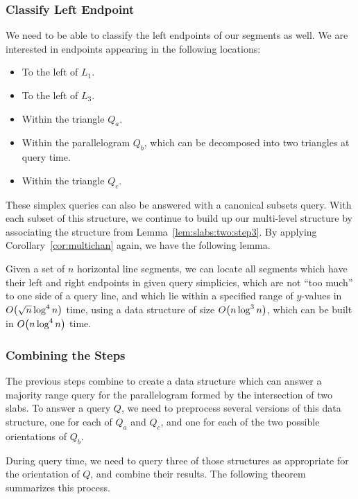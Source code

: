 \subsubsection{Classify Left Endpoint}

We need to be able to classify the left endpoints of our segments as well. We are interested in endpoints appearing in the following locations:

\begin{itemize}
 \item To the left of $L_1$.
 \item To the left of $L_3$.
 \item Within the triangle $Q_a$.
 \item Within the parallelogram $Q_b$, which can be decomposed into two triangles at query time.
 \item Within the triangle $Q_c$.
\end{itemize}

These simplex queries can also be answered with a canonical subsets query. 
With each subset of this structure, we continue to build up our multi-level structure by associating the structure from Lemma~\ref{lem:slabs:two:step3}. 
By applying Corollary~\ref{cor:multichan} again, we have the following lemma.

\begin{lemma}
\label{lem:slabs:two:step4}
Given a set of $n$ horizontal line segments, we can locate all segments which have their left and right endpoints in given query simplicies, which are not ``too much'' to one side of a query line, and which lie within a specified range of $y$-values in $O\!\left(\sqrt{n}\log^4{n}\right)$ time, using a data structure of size $O\!\left(n\log^3{n}\right)$, which can be built in $O\!\left(n\log^4{n}\right)$ time.
\end{lemma}


\subsubsection{Combining the Steps}

The previous steps combine to create a data structure which can answer a majority range query for the parallelogram formed by the intersection of two slabs. 
To answer a query $Q$, we need to preprocess several versions of this data structure, one for each of $Q_a$ and $Q_c$, and one for each of the two possible orientations of $Q_b$.

During query time, we need to query three of those structures as appropriate for the orientation of $Q$, and combine their results. The following theorem summarizes this process.

